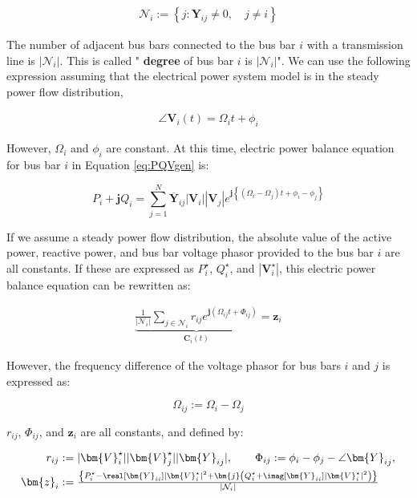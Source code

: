 \documentclass[tombow,dvipdfmx]{corona-a5-1.1}
\begin{document}
\begin{align*}
\mathcal{N}_i:=
\left\{
j : \bm{Y}_{ij} \neq 0,\quad j \neq i
\right\}
\end{align*}

The number of adjacent bus bars connected to the bus bar $i$ with a transmission line is $|\mathcal{N}_i|$.
This is called "\textbf{ degree} of bus bar $i$ is $|\mathcal{N}_i|$".
We can use the following expression assuming that the electrical power system model is in the steady power flow distribution, 

\begin{align*}
\angle \bm{V}_i (t) = \Omega_i t +\phi_i
\end{align*}

However, $\Omega_i$ and $\phi_i$ are constant. 
At this time, electric power balance equation for bus bar $i$ in Equation \ref{eq:PQVgen} is:

\[
P_i + \bm{j} Q_i = \sum_{j=1}^N \overline{\bm{Y}}_{ij} |\bm{V}_i| |\bm{V}_j|
e^{\bm{j} \left\{ ( \Omega_i - \Omega_j )t + \phi_i -\phi_j \right\}}
\]

If we assume a steady power flow distribution, the absolute value of the active power, reactive power, and bus bar voltage phasor provided to the bus bar $i$ are all constants.
If these are expressed as $P_i^{\star}$, $Q_i^{\star}$, and $|\bm{V}_i^{\star}|$, this electric power balance equation can be rewritten as:

\begin{align}\label{eq:sumcirc}
\underbrace{
\frac{1}{|\mathcal{N}_i|}\sum_{j \in \mathcal{N}_i } 
r_{ij}
e^{\bm{j} 
\left(
\Omega_{ij}t + 
\Phi_{ij}
\right) }
}_{\bm{C}_i (t)}
= \bm{z}_i
\end{align}

However, the frequency difference of the voltage phasor for bus bars $i$ and $j$ is expressed as:

\[
\Omega_{ij}:=\Omega_{i}-\Omega_{j}
\]

$r_{ij}$, $\Phi_{ij}$, and $\bm{z}_i$ are all constants, and defined by:

\begin{align*}
r_{ij} &:=|\bm{V}_i^{\star}| |\bm{V}_j^{\star}| |\bm{Y}_{ij}|, \qquad
\Phi_{ij} := \phi_i - \phi_j - \angle \bm{Y}_{ij},
\\
\bm{z}_i &:=  \tfrac{
\left\{
P_i^{\star} - \real[\bm{Y}_{ii}] |\bm{V}_i^{\star}|^2
+ \bm{j}
\left(
Q_i^{\star} + \imag [\bm{Y}_{ii}] |\bm{V}_i^{\star}|^2
\right)
\right\}
}
{|\mathcal{N}_i|}
\end{align*}
\end{document}
